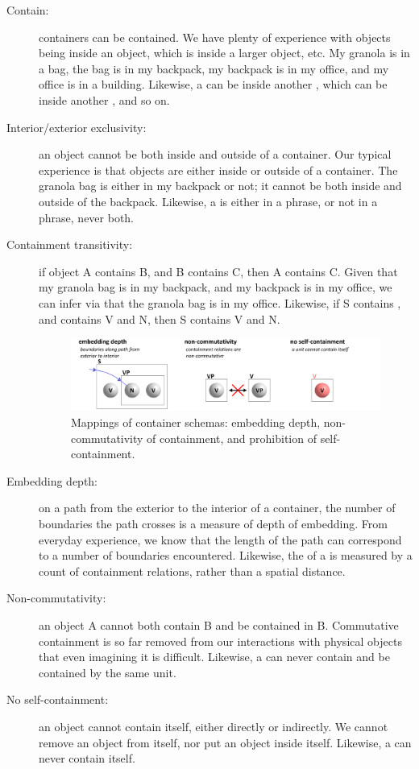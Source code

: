 \begin{description}
\item[Contain:] containers can be contained. We have plenty of experience with objects being inside an object, which is inside a larger object, etc. My granola is in a bag, the bag is in my backpack, my backpack is in my office, and my office is in a building. Likewise, a  can be inside another , which can be inside another , and so on.

\item[Interior/exterior exclusivity:] an object cannot be both inside and outside of a container. Our typical experience is that objects are either inside or outside of a container. The granola bag is either in my backpack or not; it cannot be both inside and outside of the backpack. Likewise, a  is either in a phrase, or not in a phrase, never both.

\item[Containment transitivity:] if object A contains B, and B contains C, then A contains C. Given that my granola bag is in my backpack, and my backpack is in my office, we can infer via  that the granola bag is in my office. Likewise, if S contains , and  contains V and N, then S contains V and N.

  
\begin{figure}[H]
\includegraphics[width=\textwidth]{figures/Tilsen-img33.png}
\caption{Mappings of container schemas: embedding depth, non-commutativity of containment, and prohibition of self-containment.}
\label{fig:3:5}
\end{figure}
 

\item[Embedding depth:] on a path from the exterior to the interior of a container, the number of boundaries the path crosses is a measure of depth of embedding. From everyday experience, we know that the length of the path can correspond to a number of boundaries encountered. Likewise, the  of a  is measured by a count of containment relations, rather than a spatial distance.

\item[Non-commutativity:] an object A cannot both contain B and be contained in B. Commutative containment is so far removed from our interactions with physical objects that even imagining it is difficult. Likewise, a  can never contain and be contained by the same unit.

\item[No self-containment:] an object cannot contain itself, either directly or indirectly. We cannot remove an object from itself, nor put an object inside itself. Likewise, a  can never contain itself. 
\end{description}

